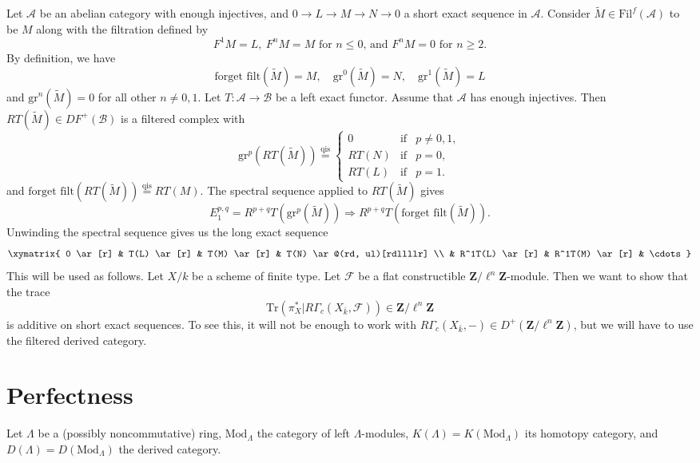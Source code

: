 \noindent
Let $\mathcal{A}$ be an abelian category with enough injectives, and
$0 \to L \to M \to N \to 0$ a short exact sequence in $\mathcal{A}$.
Consider $\widetilde M \in \text{Fil}^f(\mathcal{A})$ to be $M$ along with the
filtration defined by
$$
F^1M = L, \ F^nM = M
\text{ for $n \leq 0$, and $F^nM = 0$ for $n \geq 2$.}
$$
By definition, we have
$$
\text{forget filt}(\widetilde M) = M, \quad
\text{gr}^0(\widetilde M) = N, \quad
\text{gr}^1(\widetilde M) = L
$$
and $\text{gr}^n(\widetilde M) = 0$ for all other $n \neq 0, 1$. Let $T:
\mathcal{A} \to \mathcal{B}$ be a left exact functor. Assume that $\mathcal{A}$
has enough injectives. Then $RT(\widetilde M) \in D F^+(\mathcal{B})$ is a
filtered complex with
$$
\text{gr}^p(RT(\widetilde M)) \stackrel {\mathrm{qis}}{=} \left \{
\begin{matrix}
0 & \text{if} & p \neq 0, 1, \\
RT(N) & \text{if} & p = 0, \\
RT(L) & \text{if} & p = 1.
\end{matrix}
\right .
$$
and $\text{forget filt}(RT(\widetilde M))\stackrel{\text{qis}}{ = } RT(M)$. The
spectral sequence applied to $RT(\widetilde M)$ gives
$$
E_1^{p, q} = R^{p+q}T(\mathrm{gr}^p(\widetilde M)) \Rightarrow
R^{p+q}T(\text{forget filt}(\widetilde M)).
$$
Unwinding the spectral sequence gives us the long exact sequence
$$
\xymatrix{
0 \ar[r] & T(L) \ar[r] & T(M) \ar[r] & T(N) \ar@(rd, ul)[rdllllr] \\
& R^1T(L) \ar[r] & R^1T(M) \ar[r] & \cdots
}
$$
This will be used as follows. Let $X/k$ be a scheme of finite type. Let
$\mathcal{F}$ be a flat constructible $\mathbf{Z}/\ell^n \mathbf{Z}$-module.
Then we want to show that the trace
$$
\text{Tr}( \pi_X^\ast | R\Gamma_c(X_{\bar k}, \mathcal{F})) \in
\mathbf{Z}/\ell^n \mathbf{Z}
$$
is additive on short exact sequences. To see this, it will not be enough to
work with $R\Gamma_c(X_{\bar k}, -) \in D^+(\mathbf{Z}/\ell^n \mathbf{Z})$, but
we will have to use the filtered derived category.







\section{Perfectness}
\label{section-perfect}

\noindent
Let $\Lambda$ be a (possibly noncommutative) ring, $\text{Mod}_{\Lambda}$ the
category of left $\Lambda$-modules, $K(\Lambda) = K(\text{Mod}_\Lambda)$ its
homotopy category, and $D(\Lambda)= D(\text{Mod}_\Lambda)$ the derived
category.

